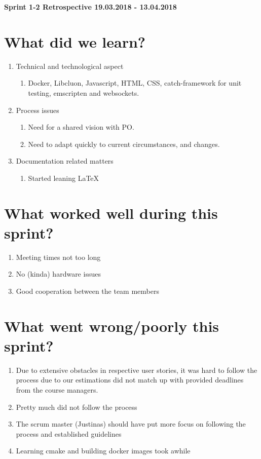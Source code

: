 \documentclass[11pt]{article}
\begin{document}
\textbf{\LARGE Sprint 1-2 Retrospective 19.03.2018 - 13.04.2018}

\section*{What did we learn?}
\begin{enumerate}
	\item Technical and technological aspect
		\begin{enumerate} 
			\item Docker, Libcluon, Javascript, HTML, CSS, catch-framework for unit testing, emscripten and websockets.
		\end{enumerate} 
	\item Process issues
		\begin{enumerate} 
			\item Need for a shared vision with PO.
			\item Need to adapt quickly to current circumstances, and changes.
		\end{enumerate}		
	\item Documentation related matters
		\begin{enumerate} 
			\item Started leaning LaTeX
		\end{enumerate}	
\end{enumerate} 

\section*{What worked well during this sprint?}
\begin{enumerate}
	\item Meeting times not too long 
	\item No (kinda) hardware issues 
	\item Good cooperation between the team members
\end{enumerate} 

\section*{What went wrong/poorly this sprint?}
\begin{enumerate}
	\item Due to extensive obstacles in respective user stories, it was hard to follow the process due to our estimations did not match up with provided deadlines from the course managers.
	\item Pretty much did not follow the process
	\item The scrum master (Justinas) should have put more focus on following the process and established guidelines
	\item Learning cmake and building docker images took awhile
\end{enumerate} 
\end{document}

